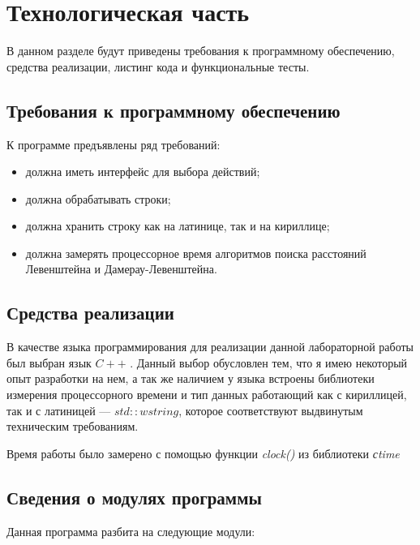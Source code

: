 \chapter{Технологическая часть}

В данном разделе будут приведены требования к программному обеспечению, средства реализации, листинг кода и функциональные тесты.

\section{Требования к программному обеспечению}

К программе предъявлены ряд требований:

\begin{itemize}
	\item должна иметь интерфейс для выбора действий;
	\item должна обрабатывать строки;
	\item должна хранить строку как на латинице, так и на кириллице;
	\item должна замерять процессорное время алгоритмов поиска расстояний Левенштейна и Дамерау-Левенштейна.
\end{itemize}

\section{Средства реализации}

В качестве языка программирования для реализации данной лабораторной работы был выбран язык $C++$ \cite{cpp-lang}. Данный выбор обусловлен тем,
что я имею некоторый опыт разработки на нем, а так же наличием у языка
встроены библиотеки измерения процессорного времени и тип данных работающий как с кириллицей, так и с латиницей --- $std::wstring$, которое соответствуют выдвинутым техническим требованиям.

Время работы было замерено с помощью функции \textit{clock()} из библиотеки \textit{сtime}\cite{cpp-lang-time}
 
\section{Сведения о модулях программы}

Данная программа разбита на следующие модули:

